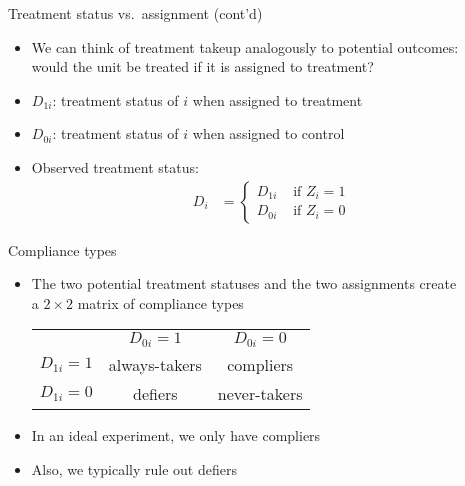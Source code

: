 \documentclass[aspectratio=169,compress,handout,t,xcolor=table]{beamer}
\begin{document}
\begin{frame}{Treatment status vs.\ assignment (cont'd)}
  \begin{itemize}
    \item We can think of treatment takeup analogously to potential outcomes: \\
    would the unit be treated if it is assigned to treatment?
    \item \(D_{1i}\): treatment status of \(i\) when assigned to treatment
    \item \(D_{0i}\): treatment status of \(i\) when assigned to control
    \item Observed treatment status:
    \begin{align*}
      D_i &= \begin{cases}
        D_{1i} & \text{ if } Z_i = 1 \\
        D_{0i} & \text{ if } Z_i = 0
      \end{cases}
      \end{align*}
  \end{itemize}
\end{frame}

\begin{frame}{Compliance types}
  \begin{itemize}
    \item The two potential treatment statuses and the two assignments create \\ a \(2 \times 2\) matrix of compliance types

    \vspace*{1em}
    \begin{table}
      \centering
      \begin{tabular}{c|c|c|}
        \multicolumn{1}{c}{} & \multicolumn{1}{c}{\(D_{0i}=1\)} & \multicolumn{1}{c}{\(D_{0i}=0\)} \\
        \cline{2-3}
        \(D_{1i}=1\) & always-takers & compliers     \\
        \cline{2-3}
        \(D_{1i}=0\) & defiers       & never-takers  \\
        \cline{2-3}
      \end{tabular}
    \end{table}
    \item In an ideal experiment, we only have compliers
    \item Also, we typically rule out defiers
  \end{itemize}
\end{frame}
\end{document}
